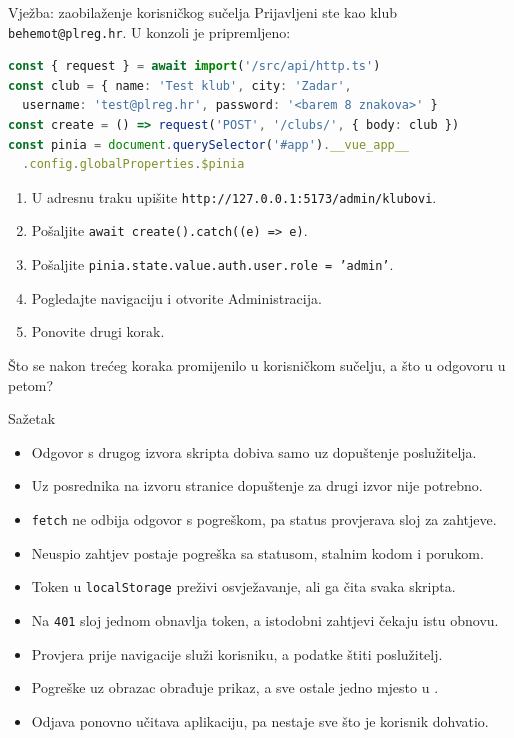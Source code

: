 \begin{frame}[fragile]{Vježba: zaobilaženje korisničkog sučelja}
Prijavljeni ste kao klub \texttt{behemot@plreg.hr}. U konzoli je pripremljeno:

\begin{lstlisting}[language=typescript]
const { request } = await import('/src/api/http.ts')
const club = { name: 'Test klub', city: 'Zadar',
  username: 'test@plreg.hr', password: '<barem 8 znakova>' }
const create = () => request('POST', '/clubs/', { body: club })
const pinia = document.querySelector('#app').__vue_app__
  .config.globalProperties.$pinia
\end{lstlisting}

\begin{enumerate}
  \itemsep0.1em
  \item U adresnu traku upišite \texttt{http://127.0.0.1:5173/admin/klubovi}.
  \item Pošaljite \texttt{await create().catch((e) => e)}.
  \item Pošaljite \texttt{pinia.state.value.auth.user.role = 'admin'}.
  \item Pogledajte navigaciju i otvorite Administracija.
  \item Ponovite drugi korak.
\end{enumerate}

\vspace{0.1em}
Što se nakon trećeg koraka promijenilo u korisničkom sučelju, a što u odgovoru u petom?
\end{frame}

\begin{frame}{Sažetak}
\begin{itemize}
  \itemsep0.05em
  \item Odgovor s drugog izvora skripta dobiva samo uz dopuštenje poslužitelja.
  \item Uz posrednika na izvoru stranice dopuštenje za drugi izvor nije potrebno.
  \item \texttt{fetch} ne odbija odgovor s pogreškom, pa status provjerava sloj za zahtjeve.
  \item Neuspio zahtjev postaje pogreška sa statusom, stalnim kodom i porukom.
  \item Token u \texttt{localStorage} preživi osvježavanje, ali ga čita svaka skripta.
  \item Na \texttt{401} sloj jednom obnavlja token, a istodobni zahtjevi čekaju istu obnovu.
  \item Provjera prije navigacije služi korisniku, a podatke štiti poslužitelj.
  \item Pogreške uz obrazac obrađuje prikaz, a sve ostale jedno mjesto u .
  \item Odjava ponovno učitava aplikaciju, pa nestaje sve što je korisnik dohvatio.
\end{itemize}
\end{frame}


